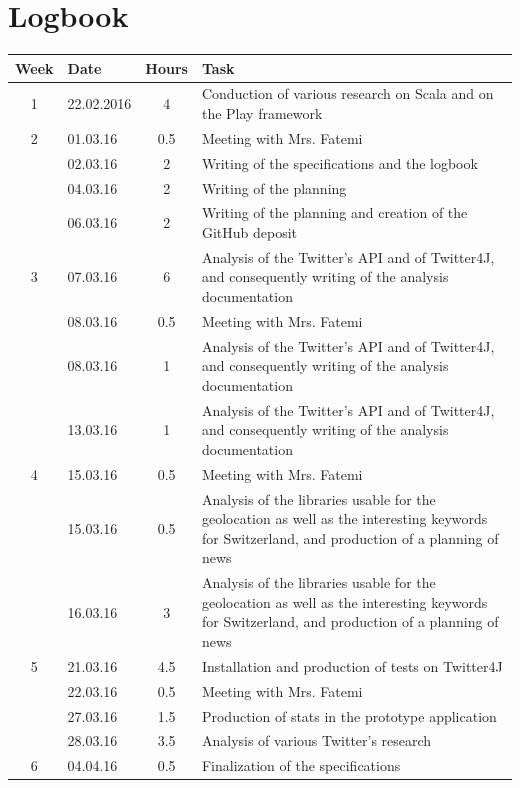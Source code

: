 \documentclass[a4paper,11pt]{report}
\begin{document}
\chapter{Logbook}
\begin{center}
\def\arraystretch{1.5}
\begin{longtable}{c|l|c|p{10cm}}
	\textbf{Week} & \textbf{Date} & \textbf{Hours} & \textbf{Task}\\\hline \endhead
	1 & 22.02.2016 & 4 & Conduction of various research on Scala and on the Play framework\\\hline
	2 & 01.03.16 & 0.5 & Meeting with Mrs. Fatemi\\
     & 02.03.16 & 2 & Writing of the specifications and the logbook\\
     & 04.03.16 & 2 & Writing of the planning\\
     & 06.03.16 & 2 & Writing of the planning and creation of the GitHub deposit\\\hline
    3 & 07.03.16 & 6 & Analysis of the Twitter's API and of Twitter4J, and consequently writing of the analysis documentation\\
     & 08.03.16 & 0.5 & Meeting with Mrs. Fatemi\\
     & 08.03.16 & 1 & Analysis of the Twitter's API and of Twitter4J, and consequently writing of the analysis documentation\\
     & 13.03.16 & 1 & Analysis of the Twitter's API and of Twitter4J, and consequently writing of the analysis documentation\\\hline
    4 & 15.03.16 & 0.5 & Meeting with Mrs. Fatemi\\
     & 15.03.16 & 0.5 & Analysis of the libraries usable for the geolocation as well as the interesting keywords for Switzerland, and production of a planning of news\\
     & 16.03.16 & 3 & Analysis of the libraries usable for the geolocation as well as the interesting keywords for Switzerland, and production of a planning of news\\\hline
    5 & 21.03.16 & 4.5 & Installation and production of tests on Twitter4J\\
     & 22.03.16 & 0.5 & Meeting with Mrs. Fatemi\\
     & 27.03.16 & 1.5 & Production of stats in the prototype application\\
     & 28.03.16 & 3.5 & Analysis of various Twitter's research\\\hline
    6 & 04.04.16 & 0.5 & Finalization of the specifications\\

\end{longtable}
\end{center}
\end{document}

